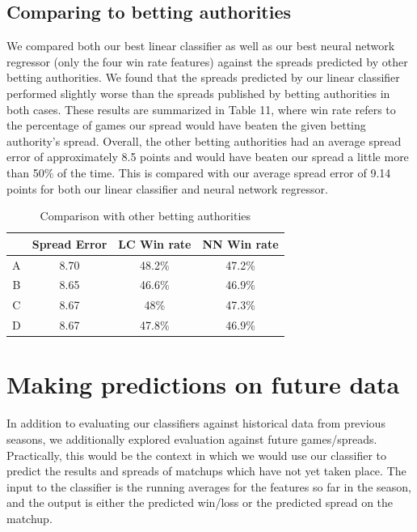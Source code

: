 \documentclass{article}
\begin{document}
\subsection{Comparing to betting authorities}
We compared both our best linear classifier as well as our best neural network regressor (only the four win rate features) against the spreads predicted by other betting authorities. We found that the spreads predicted by our linear classifier performed slightly worse than the spreads published by betting authorities in both cases. These results are summarized in Table 11, where win rate refers to the percentage of games our spread would have beaten the given betting authority's spread. Overall, the other betting authorities had an average spread error of approximately 8.5 points and would have beaten our spread a little more than 50\% of the time. This is compared with our average spread error of 9.14 points for both our linear classifier and neural network regressor.

\begin{table}
  \begin{center}
    \begin{tabular}{ | c | c | c | c| }
      \hline
                       & Spread Error      &LC  Win rate &NN Win rate \\ \hline
       A      & 8.70              & 48.2\% &47.2\%   \\ \hline
      B      & 8.65              & 46.6\%  &46.9\%  \\ \hline
      C      & 8.67              & 48\%      &47.3\%	\\ \hline
	D      & 8.67              & 47.8\%    &46.9\%\\ \hline
    \end{tabular}
  \end{center}
  \caption{Comparison with other betting authorities}
\end{table}


\section{Making predictions on future data}
In addition to evaluating our classifiers against historical data from previous seasons, we additionally explored evaluation against future games/spreads. Practically, this would be the context in which we would use our classifier to predict the results and spreads of matchups which have not yet taken place. The input to the classifier is the running averages for the features so far in the season, and the output is either the predicted win/loss or the predicted spread on the matchup.
\end{document}
